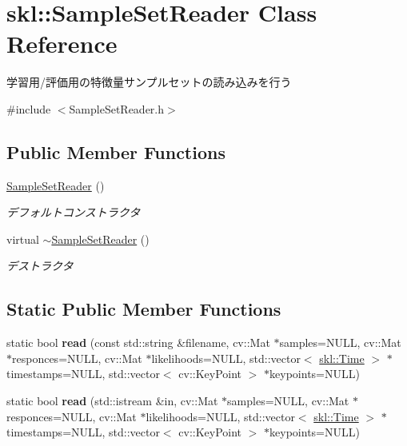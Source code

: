 \hypertarget{classskl_1_1_sample_set_reader}{}\section{skl\+:\+:Sample\+Set\+Reader Class Reference}
\label{classskl_1_1_sample_set_reader}


学習用/評価用の特徴量サンプルセットの読み込みを行う  




{\ttfamily \#include $<$Sample\+Set\+Reader.\+h$>$}

\subsection*{Public Member Functions}
\begin{DoxyCompactItemize}
\item 
\hypertarget{classskl_1_1_sample_set_reader_ad10ad73e03fc3ee176ec9d4ab036f45d}{}\label{classskl_1_1_sample_set_reader_ad10ad73e03fc3ee176ec9d4ab036f45d} 
\hyperlink{classskl_1_1_sample_set_reader_ad10ad73e03fc3ee176ec9d4ab036f45d}{Sample\+Set\+Reader} ()
\begin{DoxyCompactList}\small\item\em デフォルトコンストラクタ \end{DoxyCompactList}\item 
\hypertarget{classskl_1_1_sample_set_reader_ae051e482f383da2027f079caf4802127}{}\label{classskl_1_1_sample_set_reader_ae051e482f383da2027f079caf4802127} 
virtual \hyperlink{classskl_1_1_sample_set_reader_ae051e482f383da2027f079caf4802127}{$\sim$\+Sample\+Set\+Reader} ()
\begin{DoxyCompactList}\small\item\em デストラクタ \end{DoxyCompactList}\end{DoxyCompactItemize}
\subsection*{Static Public Member Functions}
\begin{DoxyCompactItemize}
\item 
\hypertarget{classskl_1_1_sample_set_reader_af7e8e42693c480317893320efe1a97bf}{}\label{classskl_1_1_sample_set_reader_af7e8e42693c480317893320efe1a97bf} 
static bool {\bfseries read} (const std\+::string \&filename, cv\+::\+Mat $\ast$samples=N\+U\+LL, cv\+::\+Mat $\ast$responces=N\+U\+LL, cv\+::\+Mat $\ast$likelihoods=N\+U\+LL, std\+::vector$<$ \hyperlink{classskl_1_1_time}{skl\+::\+Time} $>$ $\ast$timestamps=N\+U\+LL, std\+::vector$<$ cv\+::\+Key\+Point $>$ $\ast$keypoints=N\+U\+LL)
\item 
\hypertarget{classskl_1_1_sample_set_reader_aed41b06745e807114ee61b93d9ffbb84}{}\label{classskl_1_1_sample_set_reader_aed41b06745e807114ee61b93d9ffbb84} 
static bool {\bfseries read} (std\+::istream \&in, cv\+::\+Mat $\ast$samples=N\+U\+LL, cv\+::\+Mat $\ast$responces=N\+U\+LL, cv\+::\+Mat $\ast$likelihoods=N\+U\+LL, std\+::vector$<$ \hyperlink{classskl_1_1_time}{skl\+::\+Time} $>$ $\ast$timestamps=N\+U\+LL, std\+::vector$<$ cv\+::\+Key\+Point $>$ $\ast$keypoints=N\+U\+LL)
\end{DoxyCompactItemize}
